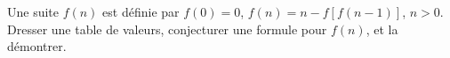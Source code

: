 Une suite $f(n)$ est définie par $f(0) = 0$, $f(n) = n - f[f(n-1)]$, $n > 0$. Dresser une table de valeurs, conjecturer une formule pour $f(n)$, et la démontrer.
